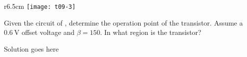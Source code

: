 \documentclass[10pt,a4paper]{memoir}
\begin{document}
\newpage
\begin{question}
  \begin{wrapfigure}{r}{6.5cm}
    \centering
    \texttt{[image: t09-3]}
    \caption{}
    \label{fig:t09-3}
  \end{wrapfigure}
  Given the circuit of , determine the operation point of the transistor. Assume a $\SI{0.6}{\volt}$ offset voltage and $\beta = 150$. In what region is the transistor?
\end{question}
\begin{solution}
  Solution goes here
\end{solution}
\end{document}
